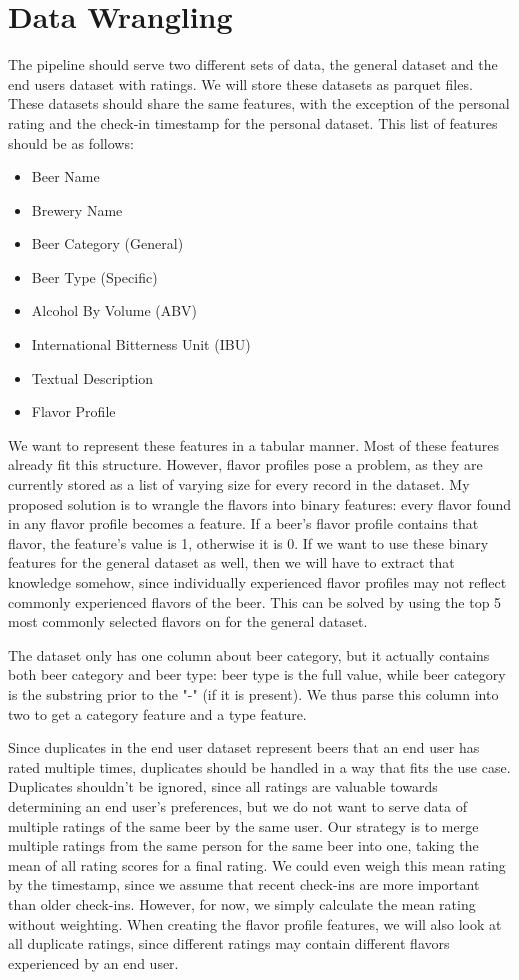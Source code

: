 \documentclass[sigconf]{acmart}
\begin{document}
\section{Data Wrangling}
The pipeline should serve two different sets of data, the general dataset and the end users dataset with ratings.
We will store these datasets as parquet files.
These datasets should share the same features, with the exception of the personal rating and the check-in timestamp for the personal dataset.
This list of features should be as follows:
\begin{itemize}
    \item Beer Name
    \item Brewery Name
    \item Beer Category (General)
    \item Beer Type (Specific)
    \item Alcohol By Volume (ABV)
    \item International Bitterness Unit (IBU)
    \item Textual Description
    \item Flavor Profile
\end{itemize}
We want to represent these features in a tabular manner.
Most of these features already fit this structure.
However, flavor profiles pose a problem, as they are currently stored as a list of varying size for every record in the \citeauthor{untappd} dataset.
My proposed solution is to wrangle the flavors into binary features: every flavor found in any flavor profile becomes a feature.
If a beer's flavor profile contains that flavor, the feature's value is 1, otherwise it is 0.
If we want to use these binary features for the general dataset as well, then we will have to extract that knowledge somehow, since individually experienced flavor profiles may not reflect commonly experienced flavors of the beer.
This can be solved by using the top 5 most commonly selected flavors on \citeauthor{untappd} for the general dataset.

The \citeauthor{untappd} dataset only has one column about beer category, but it actually contains both beer category and beer type: beer type is the full value, while beer category is the substring prior to the "-" (if it is present).
We thus parse this column into two to get a category feature and a type feature.

Since duplicates in the end user dataset represent beers that an end user has rated multiple times, duplicates should be handled in a way that fits the use case.
Duplicates shouldn't be ignored, since all ratings are valuable towards determining an end user's preferences, but we do not want to serve data of multiple ratings of the same beer by the same user.
Our strategy is to merge multiple ratings from the same person for the same beer into one, taking the mean of all rating scores for a final rating.
We could even weigh this mean rating by the timestamp, since we assume that recent check-ins are more important than older check-ins.
However, for now, we simply calculate the mean rating without weighting.
When creating the flavor profile features, we will also look at all duplicate ratings, since different ratings may contain different flavors experienced by an end user.
\end{document}
